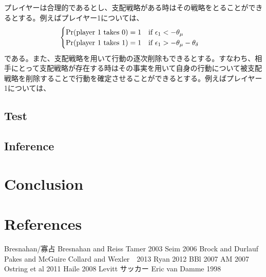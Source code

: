 \documentclass{jsarticle}
\begin{document}
プレイヤーは合理的であるとし、支配戦略がある時はその戦略をとることができるとする。例えばプレイヤー1については、
\begin{align*}
	\begin{cases}
		{\rm Pr}(\text{player 1 takes $0$}) = 1\quad \text{if}\ \epsilon_1 < -\theta_{\mu}\\
		{\rm Pr}(\text{player 1 takes $1$}) = 1\quad \text{if}\ \epsilon_1 > -\theta_{\mu} - \theta_{\delta}
	\end{cases}
\end{align*}
である。また、支配戦略を用いて行動の逐次削除もできるとする。すなわち、相手にとって支配戦略が存在する時はその事実を用いて自身の行動について被支配戦略を削除することで行動を確定させることができるとする。例えばプレイヤー1については、

\subsection{Test}

\subsection{Inference}

\section{Conclusion}

\section{References}
\begin{thebibliography}{10}
	 Bresnahan/寡占
	 Bresnahan and Reiss
	 Tamer 2003
	 Seim 2006
	 Brock and Durlauf
	 Pakes and McGuire
	 Collard and Wexler　2013
	 Ryan 2012
	 BBl 2007
	 AM 2007
	 Ostring et al 2011
	 Haile 2008
	 Levitt サッカー
	 Eric van Damme 1998
\end{thebibliography}
\end{document}
